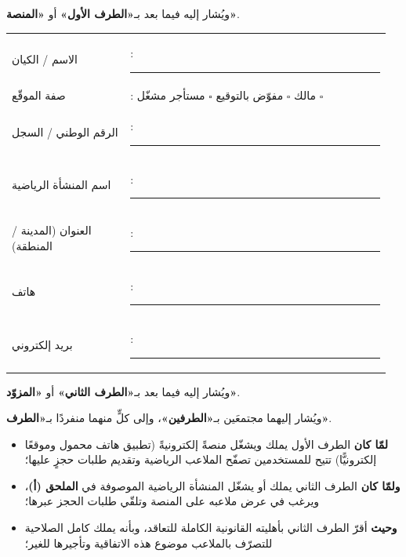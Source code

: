 \documentclass[12pt,a4paper]{article}
\newcommand{\blank}[1][3.2cm]{\rule[-0.4ex]{#1}{0.5pt}}
\newcommand{\mlh}[1]{{\bfseries #1}}
\begin{document}
\vspace{4pt}
ويُشار إليه فيما بعد بـ\mlh{«الطرف الأول»} أو \mlh{«المنصة»}.

\vspace{12pt}
\begin{tabular}{@{}p{0.30\linewidth}@{}p{0.66\linewidth}@{}}
الاسم / الكيان         & : \blank[8cm]\\[6pt]
صفة الموقّع            & : مالك \; $\square$ \quad مفوّض بالتوقيع \; $\square$ \quad مستأجر مشغّل \; $\square$\\[6pt]
الرقم الوطني / السجل   & : \blank[8cm]\\[6pt]
اسم المنشأة الرياضية   & : \blank[8cm]\\[6pt]
العنوان (المدينة / المنطقة) & : \blank[8cm]\\[6pt]
هاتف                   & : \blank[8cm]\\[6pt]
بريد إلكتروني          & : \blank[8cm]\\
\end{tabular}

\vspace{4pt}
ويُشار إليه فيما بعد بـ\mlh{«الطرف الثاني»} أو \mlh{«المزوّد»}.

\vspace{6pt}
ويُشار إليهما مجتمعَين بـ\mlh{«الطرفين»}، وإلى كلٍّ منهما منفردًا بـ\mlh{«الطرف»}.

\vspace{14pt}
\par
\vspace{2pt}\noindent{\color{rule}\rule{\linewidth}{0.6pt}}\par\vspace{4pt}

\begin{itemize}[leftmargin=1.4em,itemsep=3pt,topsep=2pt]
  \item \mlh{لمّا كان} الطرف الأول يملك ويشغّل منصةً إلكترونيةً (تطبيق هاتف محمول وموقعًا إلكترونيًّا) تتيح للمستخدمين تصفّح الملاعب الرياضية وتقديم طلبات حجزٍ عليها؛
  \item \mlh{ولمّا كان} الطرف الثاني يملك أو يشغّل المنشأة الرياضية الموصوفة في \mlh{الملحق (أ)}، ويرغب في عرض ملاعبه على المنصة وتلقّي طلبات الحجز عبرها؛
  \item \mlh{وحيث} أقرّ الطرف الثاني بأهليته القانونية الكاملة للتعاقد، وبأنه يملك كامل الصلاحية للتصرّف بالملاعب موضوع هذه الاتفاقية وتأجيرها للغير؛
\end{itemize}
\end{document}
